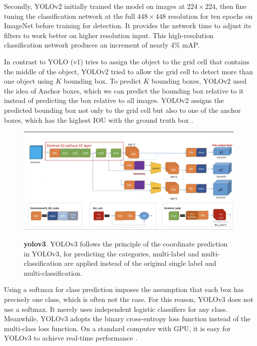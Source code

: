 Secondly, YOLOv2 initially trained the model on images at $224×224$, then ﬁne tuning the classiﬁcation network at the full $448×448$ resolution for ten epochs on ImageNet before training for detection.  It provides the network time to adjust its ﬁlters to work better on higher resolution input. This high-resolution classiﬁcation network produces an increment of nearly 4\% mAP\cite{yolov2}.

In contrast to YOLO (v1) tries to assign the object to the grid cell that contains the middle of the object,  YOLOv2 tried to allow the grid cell to detect more than one object using  $K$ bounding box. To predict $ K$ bounding boxes, YOLOv2 used the idea of Anchor boxes, which we can predict the bounding box relative to it instead of predicting the box relative to all images.   YOLOv2 assigns the predicted bounding box not only to the grid cell but also to one of the anchor boxes, which has the highest IOU with the ground truth box \cite{yolov2}. 


\begin{figure}[t]
\begin{center}
\centering
\includegraphics[width=\textwidth]{thesis-template-master/images/yolov3.png}
\label{fig:cellnet}

\end{center}
\caption{\textbf{yolov3}. YOLOv3 follows the principle of the coordinate prediction in YOLOv3, for predicting the categories, multi-label and multi-classification are applied instead of the original single label and multi-classification.}
\end{figure}

Using a softmax for class prediction imposes the assumption that each box has precisely one class, which is often not the case. For this reason, YOLOv3 does not use a softmax. It merely uses independent logistic classiﬁers for any class. Meanwhile, YOLOv3 adopts the binary cross-entropy loss function instead of the multi-class loss function. On a standard computer with GPU, it is easy for YOLOv3 to achieve real-time performance \cite{18}.  

